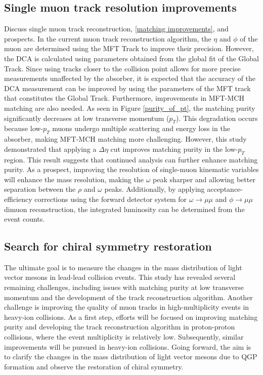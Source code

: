     \subsection{Single muon track resolution improvements}   
        Discuss single muon track reconstruction, \ref{matching improvements}, and prospects. In the current muon track reconstruction algorithm, the \(\eta\) and \(\phi\) of the muon are determined using the MFT Track to improve their precision. However, the DCA is calculated using parameters obtained from the global fit of the Global Track. Since using tracks closer to the collision point allows for more precise measurements unaffected by the absorber, it is expected that the accuracy of the DCA measurement can be improved by using the parameters of the MFT track that constitutes the Global Track. Furthermore, improvements in MFT-MCH matching are also needed. As seen in Figure \ref{purity_of_pt}, the matching purity significantly decreases at low transverse momentum (\( p_T \)). This degradation occurs because low-\( p_T \) muons undergo multiple scattering and energy loss in the absorber, making MFT-MCH matching more challenging. However, this study demonstrated that applying a \( \Delta \eta \) cut improves matching purity in the low-\( p_T \) region. This result suggests that continued analysis can further enhance matching purity.
        As a prospect, improving the resolution of single-muon kinematic variables will enhance the mass resolution, making the $\omega$ peak sharper and allowing better separation between the $\rho$ and $\omega$ peaks. Additionally, by applying acceptance-efficiency corrections using the forward detector system for $\omega \rightarrow \mu\mu$ and $\phi \rightarrow \mu\mu$ dimuon reconstruction, the integrated luminosity can be determined from the event counts. 
    
    \subsection{Search for chiral symmetry restoration}
    The ultimate goal is to measure the changes in the mass distribution of light vector mesons in lead-lead collision events. This study has revealed several remaining challenges, including issues with matching purity at low transverse momentum and the development of the track reconstruction algorithm. Another challenge is improving the quality of muon tracks in high-multiplicity events in heavy-ion collisions. As a first step, efforts will be focused on improving matching purity and developing the track reconstruction algorithm in proton-proton collisions, where the event multiplicity is relatively low. 
    Subsequently, similar improvements will be pursued in heavy-ion collisions. 
    Going forward, the aim is to clarify the changes in the mass distribution of light vector mesons due to QGP formation and observe the restoration of chiral symmetry.
